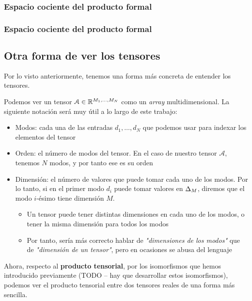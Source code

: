 \subsubsection{Espacio cociente del producto formal}

\subsubsection{Espacio cociente del producto formal}

\subsection{Otra forma de ver los tensores}

Por lo visto anteriormente, tenemos una forma más concreta de entender los tensores.

Podemos ver un tensor $\mathcal{A} \in \mathbb{R}^{M_1, \ldots, M_N}$ como un \textit{array} multidimensional. La siguiente notación será muy útil a lo largo de este trabajo:

\begin{itemize}
    \item Modos: cada una de las entradas $d_1, \ldots, d_N$ que podemos usar para indexar los elementos del tensor
    \item Orden: el número de modos del tensor. En el caso de nuestro tensor $\mathcal{A}$, tenemos $N$ modos, y por tanto ese es su orden
    \item Dimensión: el número de valores que puede tomar cada uno de los modos. Por lo tanto, si en el primer modo $d_i$ puede tomar valores en $\Delta_{M}$, diremos que el modo $i$-ésimo tiene dimensión $M$.
        \begin{itemize}
            \item Un tensor puede tener distintas dimensiones en cada uno de los modos, o tener la misma dimensión para todos los modos
            \item Por tanto, sería más correcto hablar de \textit{"dimensiones de los modos"} que de \textit{"dimensión de un tensor"}, pero en ocasiones se abusa del lenguaje
        \end{itemize}
\end{itemize}

Ahora, respecto al \textbf{producto tensorial}, por los isomorfismos que hemos introducido previamente (TODO -- hay que desarrollar estos isomorfismos), podemos ver el producto tensorial entre dos tensores reales de una forma más sencilla.

